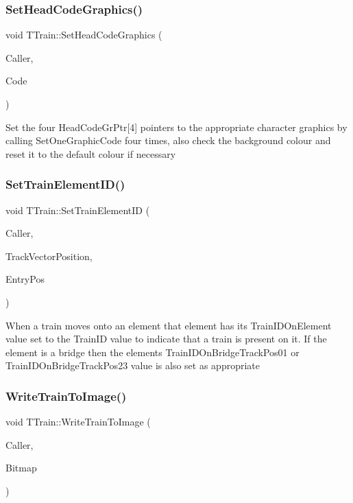 \subsubsection{\texorpdfstring{Set\+Head\+Code\+Graphics()}{SetHeadCodeGraphics()}}
{\footnotesize\ttfamily void T\+Train\+::\+Set\+Head\+Code\+Graphics (\begin{DoxyParamCaption}\item[{int}]{Caller,  }\item[{Ansi\+String}]{Code }\end{DoxyParamCaption})\hspace{0.3cm}{\ttfamily [private]}}

Set the four Head\+Code\+Gr\+Ptr\mbox{[}4\mbox{]} pointers to the appropriate character graphics by calling Set\+One\+Graphic\+Code four times, also check the background colour and reset it to the default colour if necessary \mbox{\label{class_t_train_a0e0ab54415645b04cbdeadd829d27898}} 
\subsubsection{\texorpdfstring{Set\+Train\+Element\+I\+D()}{SetTrainElementID()}}
{\footnotesize\ttfamily void T\+Train\+::\+Set\+Train\+Element\+ID (\begin{DoxyParamCaption}\item[{int}]{Caller,  }\item[{unsigned int}]{Track\+Vector\+Position,  }\item[{int}]{Entry\+Pos }\end{DoxyParamCaption})\hspace{0.3cm}{\ttfamily [private]}}

When a train moves onto an element that element has its Train\+I\+D\+On\+Element value set to the Train\+ID value to indicate that a train is present on it. If the element is a bridge then the element\textquotesingle{}s Train\+I\+D\+On\+Bridge\+Track\+Pos01 or Train\+I\+D\+On\+Bridge\+Track\+Pos23 value is also set as appropriate \mbox{\label{class_t_train_a86107a63225b0500b29e049f13545fff}} 
\subsubsection{\texorpdfstring{Write\+Train\+To\+Image()}{WriteTrainToImage()}}
{\footnotesize\ttfamily void T\+Train\+::\+Write\+Train\+To\+Image (\begin{DoxyParamCaption}\item[{int}]{Caller,  }\item[{Graphics\+::\+T\+Bitmap $\ast$}]{Bitmap }\end{DoxyParamCaption})\hspace{0.3cm}{\ttfamily [private]}}

